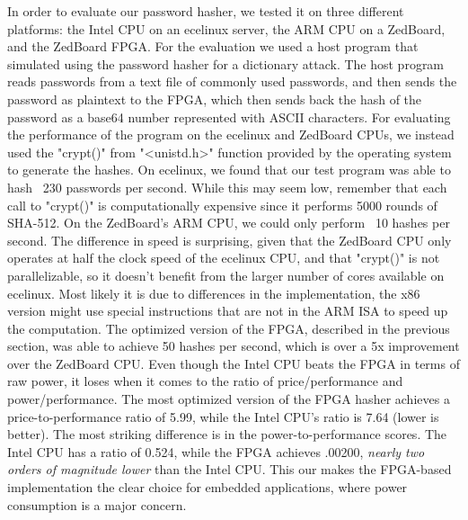In order to evaluate our password hasher, we tested it on three different platforms: the Intel CPU on an
ecelinux server, the ARM CPU on a ZedBoard, and the ZedBoard FPGA. For the evaluation we used a host program
that simulated using the password hasher for a dictionary attack. The host program reads passwords from
a text file of commonly used passwords, and then sends the password as plaintext to the FPGA, which
then sends back the hash of the password as a base64 number represented with ASCII characters. For
evaluating the performance of the program on the ecelinux and ZedBoard CPUs, we instead used the 
"crypt()" from "<unistd.h>" function provided by the operating system to generate the hashes. On
ecelinux, we found that our test program was able to hash ~230 passwords per second. While this may seem
low, remember that each call to "crypt()" is computationally expensive since it performs 5000 rounds of
SHA-512. On the ZedBoard's ARM CPU, we could only perform ~10 hashes per second. The difference in speed
is surprising, given that the ZedBoard CPU only operates at half the clock speed of the ecelinux CPU, and
that "crypt()" is not parallelizable, so it doesn't benefit from the larger number of cores available on
ecelinux. Most likely it is due to differences in the implementation, the x86 version might use special
instructions that are not in the ARM ISA to speed up the computation. The optimized version of the FPGA,
described in the previous section, was able to achieve 50 hashes per second, which is over a 5x
improvement over the ZedBoard CPU. Even though the Intel CPU beats the FPGA in terms of raw
power, it loses when it comes to the ratio of price/performance and power/performance. The most optimized
version of the FPGA hasher achieves a price-to-performance ratio of 5.99, while the Intel CPU's ratio is
7.64 (lower is better). The most striking difference is in the power-to-performance scores. The Intel CPU
has a ratio of 0.524, while the FPGA achieves .00200, \emph{nearly two orders of magnitude lower} than the
Intel CPU. This our makes the FPGA-based implementation the clear choice for embedded applications, where
power consumption is a major concern.

